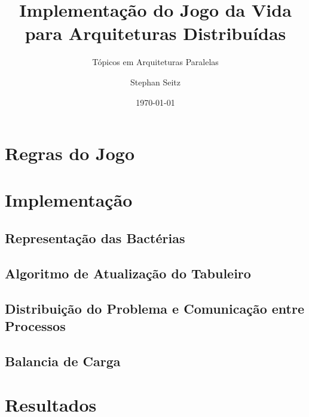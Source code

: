 \documentclass[
  oneside,
  11pt, a4paper,
  footinclude=true,
  headinclude=true,
  cleardoublepage=empty
]{scrartcl}
\title{Implementação do Jogo da Vida para Arquiteturas Distribuídas}
\subtitle{T\'opicos em Arquiteturas Paralelas}
\author{Stephan Seitz}
\date{\today}
\begin{document}
\maketitle
\tableofcontents
\newpage

\section{Regras do Jogo}


\section{Implementação}

\subsection{Representação das Bactérias}


\subsection{Algoritmo de Atualização do Tabuleiro}


\subsection{Distribuição do Problema e Comunicação entre Processos}


\subsection{Balancia de Carga}


\section{Resultados}


\newpage
\printbibliography
\end{document}
